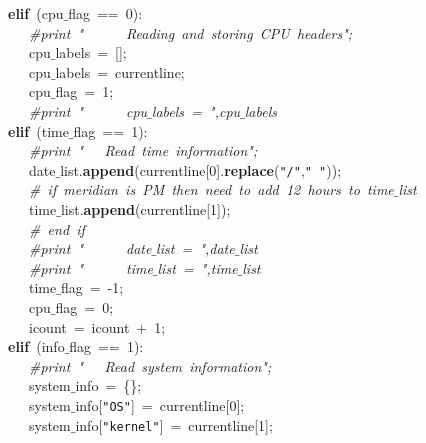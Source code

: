 \mbox{}\ \ \ \ \ \ \ \ \ \textbf{elif}\ (cpu$\_$flag\ ==\ 0): \\
\mbox{}\ \ \ \ \ \ \ \ \ \ \ \ \textit{\#print\ "{}\ \ \ \ \ \ Reading\ and\ storing\ CPU\ headers"{};} \\
\mbox{}\ \ \ \ \ \ \ \ \ \ \ \ cpu$\_$labels\ =\ []; \\
\mbox{}\ \ \ \ \ \ \ \ \ \ \ \ cpu$\_$labels\ =\ currentline; \\
\mbox{}\ \ \ \ \ \ \ \ \ \ \ \ cpu$\_$flag\ =\ 1; \\
\mbox{}\ \ \ \ \ \ \ \ \ \ \ \ \textit{\#print\ "{}\ \ \ \ \ \ cpu$\_$labels\ =\ "{},cpu$\_$labels} \\
\mbox{}\ \ \ \ \ \ \ \ \ \textbf{elif}\ (time$\_$flag\ ==\ 1): \\
\mbox{}\ \ \ \ \ \ \ \ \ \ \ \ \textit{\#print\ "{}\ \ \ Read\ time\ information"{};} \\
\mbox{}\ \ \ \ \ \ \ \ \ \ \ \ date$\_$list.\textbf{append}(currentline[0].\textbf{replace}(\texttt{"{}/"{}},\texttt{"{}\ "{}})); \\
\mbox{}\ \ \ \ \ \ \ \ \ \ \ \ \textit{\#\ if\ meridian\ is\ PM\ then\ need\ to\ add\ 12\ hours\ to\ time$\_$list} \\
\mbox{}\ \ \ \ \ \ \ \ \ \ \ \ time$\_$list.\textbf{append}(currentline[1]); \\
\mbox{}\ \ \ \ \ \ \ \ \ \ \ \ \textit{\#\ end\ if} \\
\mbox{}\ \ \ \ \ \ \ \ \ \ \ \ \textit{\#print\ "{}\ \ \ \ \ \ date$\_$list\ =\ "{},date$\_$list} \\
\mbox{}\ \ \ \ \ \ \ \ \ \ \ \ \textit{\#print\ "{}\ \ \ \ \ \ time$\_$list\ =\ "{},time$\_$list} \\
\mbox{}\ \ \ \ \ \ \ \ \ \ \ \ time$\_$flag\ =\ -1; \\
\mbox{}\ \ \ \ \ \ \ \ \ \ \ \ cpu$\_$flag\ =\ 0; \\
\mbox{}\ \ \ \ \ \ \ \ \ \ \ \ icount\ =\ icount\ +\ 1; \\
\mbox{}\ \ \ \ \ \ \ \ \ \textbf{elif}\ (info$\_$flag\ ==\ 1): \\
\mbox{}\ \ \ \ \ \ \ \ \ \ \ \ \textit{\#print\ "{}\ \ \ Read\ system\ information"{};} \\
\mbox{}\ \ \ \ \ \ \ \ \ \ \ \ system$\_$info\ =\ \{\}; \\
\mbox{}\ \ \ \ \ \ \ \ \ \ \ \ system$\_$info[\texttt{"{}OS"{}}]\ =\ currentline[0]; \\
\mbox{}\ \ \ \ \ \ \ \ \ \ \ \ system$\_$info[\texttt{"{}kernel"{}}]\ =\ currentline[1]; \\

